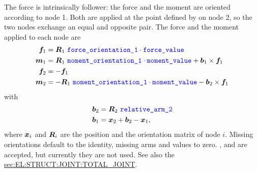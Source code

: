 The  force is intrinsically follower:
the force and the moment are oriented according to node 1.
Both are applied at the point defined by 
on node 2, so the two nodes exchange an equal and opposite pair.
The force and the moment applied to each node are
\begin{subequations}
\begin{align}
	\boldsymbol{f}_1 & = \boldsymbol{R}_1 \ \textcolor{blue}{\texttt{force\_orientation\_1}} \cdot \textcolor{blue}{\texttt{force\_value}} \\
	\boldsymbol{m}_1 & = \boldsymbol{R}_1 \ \textcolor{blue}{\texttt{moment\_orientation\_1}} \cdot \textcolor{blue}{\texttt{moment\_value}}
		+ \boldsymbol{b}_1 \times \boldsymbol{f}_1 \\
	\boldsymbol{f}_2 & = - \boldsymbol{f}_1 \\
	\boldsymbol{m}_2 & = - \boldsymbol{R}_1 \ \textcolor{blue}{\texttt{moment\_orientation\_1}} \cdot \textcolor{blue}{\texttt{moment\_value}}
		- \boldsymbol{b}_2 \times \boldsymbol{f}_1
\end{align}
\end{subequations}
with
\begin{subequations}
\begin{align}
	\boldsymbol{b}_2 & = \boldsymbol{R}_2 \ \textcolor{blue}{\texttt{relative\_arm\_2}} \\
	\boldsymbol{b}_1 & = \boldsymbol{x}_2 + \boldsymbol{b}_2 - \boldsymbol{x}_1 ,
\end{align}
\end{subequations}
where $\boldsymbol{x}_i$ and $\boldsymbol{R}_i$ are the position and the orientation matrix
of node $i$.
Missing orientations default to the identity,
missing arms and values to zero.
, 
and  are accepted,
but currently they are not used.
See also the
\hyperref{\kw{total joint}}{\kw{total joint} (Section~}{)}{sec:EL:STRUCT:JOINT:TOTAL_JOINT}.

